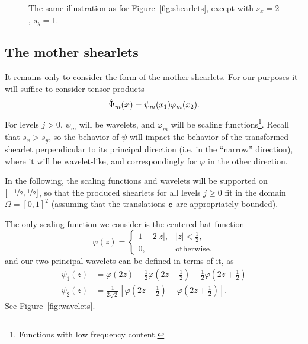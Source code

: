 \begin{figure}
\caption{The same illustration as for Figure~\ref{fig:shearlets}, except with $s_x=2$, $s_y=1$.}
\label{fig:shearlets2}
\end{figure}

\subsection{The mother shearlets}

It remains only to consider the form of the mother shearlets. For our purposes it will suffice to consider
tensor products
\[
    \hat{\Psi}_m({\bm x}) = \psi_m(x_1) \varphi_m(x_2).
\]
For levels $j>0$, $\psi_m$ will be wavelets, and $\varphi_m$ will be scaling functions\footnote{Functions with
low frequency content.}. Recall that $s_x>s_y$, so the behavior of $\psi$ will impact the behavior of the
transformed shearlet perpendicular to its principal direction (i.e. in the ``narrow'' direction), where it
will be wavelet-like, and correspondingly for $\varphi$ in the other direction.

In the following, the scaling functions and wavelets will be supported on
$[-\nicefrac{1}{2},\nicefrac{1}{2}]$, so that the produced shearlets for all levels $j \geq 0$ fit in the
domain $\Omega=[0,1]^2$ (assuming that the translations ${\bm c}$ are appropriately bounded).

The only scaling function we consider is the centered hat function
\[
    \varphi(z) = \begin{cases} 1-2|z|,& |z| < \frac{1}{2}, \\ 0,& \text{otherwise}. \end{cases}
\]
and our two principal wavelets can be defined in terms of it, as
\begin{align*}
    \psi_1(z) &= \varphi(2z) - \frac{1}{2} \varphi\left(2z-\frac{1}{2}\right)
                   - \frac{1}{2} \varphi\left(2z+\frac{1}{2}\right) \\
                   \psi_2(z) &= \frac{1}{2\sqrt{2}}
                   \left[\varphi\left(2z-\frac{1}{2}\right) - \varphi\left(2z+\frac{1}{2}\right)\right].
\end{align*}
See Figure~\ref{fig:wavelets}.

